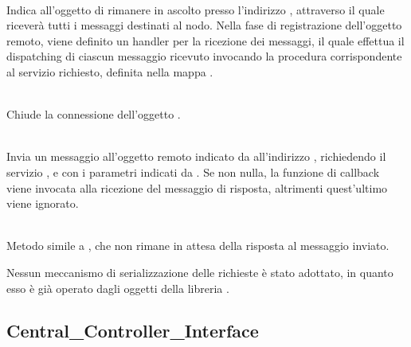 	\begin{description}
		\item {} \\
		Indica all'oggetto  di rimanere in ascolto presso l'indirizzo , attraverso il quale riceverà tutti i messaggi destinati al nodo. Nella fase di registrazione dell'oggetto remoto, viene definito un handler per la ricezione dei messaggi, il quale effettua il dispatching di ciascun messaggio ricevuto invocando la procedura corrispondente al servizio richiesto, definita nella mappa .
		
		\item {} \\
		Chiude la connessione dell'oggetto .
		
		\item {}\\
		Invia un messaggio all'oggetto remoto indicato da  all'indirizzo , richiedendo il servizio , e con i parametri indicati da . Se non nulla, la funzione di callback  viene invocata alla ricezione del messaggio di risposta, altrimenti quest'ultimo viene ignorato.
		
		\item {}\\
		Metodo simile a , che non rimane in attesa della risposta al messaggio inviato.
	\end{description}
	
	Nessun meccanismo di serializzazione delle richieste è stato adottato, in quanto esso è già operato dagli oggetti della libreria .
	
	\subsection{Central\_Controller\_Interface}
	
